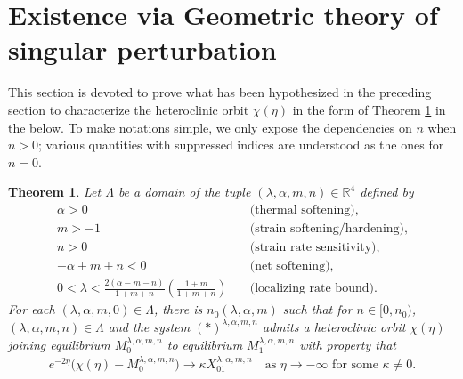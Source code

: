 \documentclass[a4paper,11pt]{article}
\newtheorem{theorem}{Theorem}
\theoremstyle{remark}
\begin{document}
%

\section{Existence via Geometric theory of singular perturbation} \label{sec:proof}
This section is devoted to prove what has been hypothesized in the preceding section to characterize the heteroclinic orbit $\chi(\eta)$ in the form of Theorem \ref{thm1} in the below. To make notations simple, we only expose the dependencies on $n$ when $n>0$; various quantities with suppressed indices are understood as the ones for $n=0$.
\begin{theorem} \label{thm1}
Let $\Lambda$ be a domain of the tuple $(\lambda,\alpha,m,n)\in\mathbb{R}^4$ defined by %
 \begin{align*}
  \alpha>0\quad&\text{(thermal softening)},\\
  m>-1 \quad&\text{(strain softening/hardening)}, \\%
  n>0 \quad&\text{(strain rate sensitivity)},\\ %
  -\alpha+m+n<0 \quad&\text{(net softening)}, \\%
  0< \lambda < \frac{2(\alpha-m-n)}{1+m+n}\left(\frac{1+m}{1+m+n}\right) \quad&\text{(localizing rate bound)}. %
\end{align*}
 For each $(\lambda,\alpha,m,0) \in \Lambda$, there is $n_0( \lambda,\alpha,m)$ such that for $n \in [0, n_0)$, $(\lambda,\alpha,m,n) \in \Lambda$ and the system $(*)^{\lambda,\alpha,m,n}$ admits a heteroclinic orbit $\chi(\eta)$ joining equilibrium $M_0^{\lambda,\alpha,m,n}$ to equilibrium $M_1^{\lambda,\alpha,m,n}$ with property that
    \begin{align} \label{eq:rapid}
        e^{-2\eta}\big(\chi(\eta) - M_0^{\lambda,\alpha,m,n}\big) \rightarrow \kappa X_{01}^{\lambda,\alpha,m,n} \quad \text{as $\eta \rightarrow -\infty$ for some $\kappa\ne0$}.
    \end{align}
\end{theorem}
\end{document}
